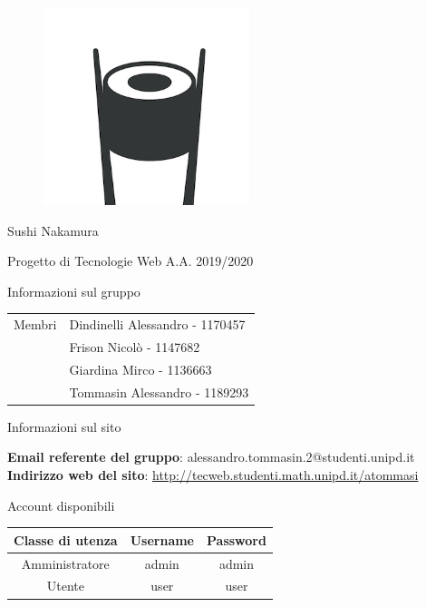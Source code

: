 \documentclass{article}
\begin{document}
	\begin{titlepage}
		\begin{figure}[http]
			\centering
			\includegraphics[width=6cm]{logo.jpg}
		\end{figure}
	
		\vspace*{2cm}
		
		{\huge\bfseries\centerline{Sushi Nakamura} }
		\centerline{Progetto di Tecnologie Web A.A. 2019/2020}
		
		\vspace*{1cm}
		{\bfseries \centerline{Informazioni sul gruppo}}
		\begin{center}
			\begin{tabular}{ c|l } 
				Membri & Dindinelli Alessandro - 1170457\\ 
				& Frison Nicolò - 1147682\\ 
				& Giardina Mirco - 1136663\\
				& Tommasin Alessandro - 1189293\\ 
			\end{tabular}
		\end{center}
		\vspace*{1cm}
		{\bfseries \centerline{Informazioni sul sito}}
		\vspace*{0.5cm}
		{\bfseries Email referente del gruppo}: alessandro.tommasin.2@studenti.unipd.it
		\newline
		{\bfseries Indirizzo web del sito}: \url{http://tecweb.studenti.math.unipd.it/atommasi}
		\vspace*{0cm}
		\newline
		{\bfseries \centerline{Account disponibili}}
		\begin{center}
			\begin{tabular}{ c|c|c } 
			\textbf{Classe di utenza} & \textbf{Username} & \textbf{Password} \\
				\hline
				 Amministratore &  admin &  admin  \\ 
				\hline
				 Utente &  user &  user  \\ 
				\hline
			\end{tabular}
		\end{center}
		\vspace*{\fill}
		
	\end{titlepage}
	
\end{document}
